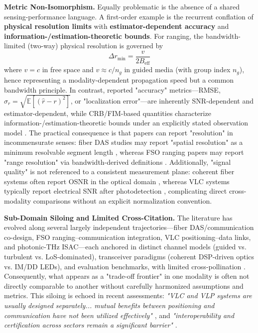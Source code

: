 \documentclass[lettersize,journal]{IEEEtran}
\begin{document}
\textbf{Metric Non-Isomorphism.} Equally problematic is the absence of a shared sensing-performance language. A first-order example is the recurrent conflation of \textbf{physical resolution limits} with \textbf{estimator-dependent accuracy} and \textbf{information-/estimation-theoretic bounds}. For ranging, the bandwidth-limited (two-way) physical resolution is governed by
\begin{equation}
\Delta r_{\min}=\frac{v}{2B_{\text{eff}}}
\end{equation}
where $v=c$ in free space and $v\approx c/n_g$ in guided media (with group index $n_g$), hence representing a modality-dependent propagation speed but a common bandwidth principle. In contrast, reported "accuracy" metrics---RMSE, $\sigma_r = \sqrt{\mathbb{E}[(\hat r - r)^2]}$, or "localization error"---are inherently SNR-dependent and estimator-dependent, while CRB/FIM-based quantities characterize information-/estimation-theoretic bounds under an explicitly stated observation model \cite{O_ISAC_013,O_ISAC_050,O_ISAC_056}. The practical consequence is that papers can report "resolution" in incommensurate senses: fiber DAS studies may report "spatial resolution" as a minimum resolvable segment length \cite{O_ISAC_013}, whereas FSO ranging papers may report "range resolution" via bandwidth-derived definitions \cite{O_ISAC_035}. Additionally, "signal quality" is not referenced to a consistent measurement plane: coherent fiber systems often report OSNR in the optical domain \cite{O_ISAC_028}, whereas VLC systems typically report electrical SNR after photodetection \cite{O_ISAC_009}, complicating direct cross-modality comparisons without an explicit normalization convention.

\textbf{Sub-Domain Siloing and Limited Cross-Citation.} The literature has evolved along several largely independent trajectories---fiber DAS/communication co-design, FSO ranging--communication integration, VLC positioning--data links, and photonic-THz ISAC---each anchored in distinct channel models (guided vs. turbulent vs. LoS-dominated), transceiver paradigms (coherent DSP-driven optics vs. IM/DD LEDs), and evaluation benchmarks, with limited cross-pollination \cite{O_ISAC_033,O_ISAC_050,O_ISAC_082}. Consequently, what appears as a "trade-off frontier" in one modality is often not directly comparable to another without carefully harmonized assumptions and metrics. This siloing is echoed in recent assessments: \textit{"VLC and VLP systems are usually designed separately... mutual benefits between positioning and communication have not been utilized effectively"} \cite{O_ISAC_039}, and \textit{"interoperability and certification across sectors remain a significant barrier"} \cite{O_ISAC_161}.
\end{document}
